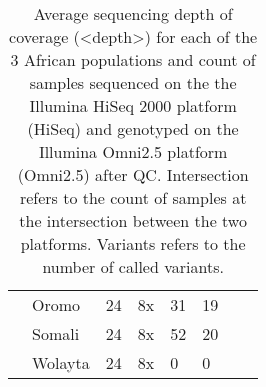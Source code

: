 \begin{table}[h]
{\begin{tabular}{llllllll}
                          & Oromo   & 24                                                      & 8x                            & 31                                                     & 19                                                            &                                                          &                                                         \\ \cline{2-6}
                          & Somali  & 24                                                      & 8x                            & 52                                                     & 20                                                            &                                                          &                                                         \\ \cline{2-6}
                          & Wolayta & 24                                                      & 8x                            & 0                                                      & 0                                                             &                                                          &                                                         \\ \hline
\end{tabular}
}
\caption{Average sequencing depth of coverage (<depth>) for each of the 3 African populations and count of samples sequenced on the the Illumina HiSeq 2000 platform (HiSeq) and genotyped on the Illumina Omni2.5 platform (Omni2.5) after \gls{QC}. Intersection refers to the count of samples at the intersection between the two platforms. Variants refers to the number of called variants.}
\label{tab:samples}
\end{table}